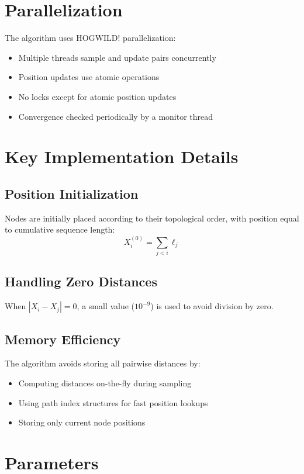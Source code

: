 \documentclass{article}
\begin{document}
\section{Parallelization}

The algorithm uses HOGWILD! parallelization:
\begin{itemize}
    \item Multiple threads sample and update pairs concurrently
    \item Position updates use atomic operations
    \item No locks except for atomic position updates
    \item Convergence checked periodically by a monitor thread
\end{itemize}

\section{Key Implementation Details}

\subsection{Position Initialization}
Nodes are initially placed according to their topological order, with position equal to cumulative sequence length:
\begin{equation}
X_i^{(0)} = \sum_{j<i} \ell_j
\end{equation}

\subsection{Handling Zero Distances}
When $|X_i - X_j| = 0$, a small value ($10^{-9}$) is used to avoid division by zero.

\subsection{Memory Efficiency}
The algorithm avoids storing all pairwise distances by:
\begin{itemize}
    \item Computing distances on-the-fly during sampling
    \item Using path index structures for fast position lookups
    \item Storing only current node positions
\end{itemize}

\section{Parameters}
\end{document}
